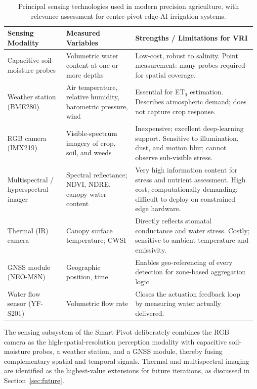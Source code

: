 \documentclass[12pt,a4paper]{report}
\renewcommand{\arraystretch}{1.3}
\begin{document}
\begin{table}[H]
\centering
\small
\caption{Principal sensing technologies used in modern precision agriculture, with relevance assessment for centre-pivot edge-AI irrigation systems.}
\label{tab:sensing}
\setlength{\tabcolsep}{4pt}
\renewcommand{\arraystretch}{1.3}
\begin{tabular}{|P{0.22\textwidth}|P{0.26\textwidth}|P{0.42\textwidth}|}
\hline
{}
\textbf{Sensing Modality} & \textbf{Measured Variables} & \textbf{Strengths / Limitations for VRI} \\
\hline
Capacitive soil-moisture probes & Volumetric water content at one or more depths & Low-cost, robust to salinity. Point measurement: many probes required for spatial coverage. \\
\hline
{}
Weather station (BME280) & Air temperature, relative humidity, barometric pressure, wind & Essential for ET$_0$ estimation. Describes atmospheric demand; does not capture crop response. \\
\hline
RGB camera (IMX219) & Visible-spectrum imagery of crop, soil, and weeds & Inexpensive; excellent deep-learning support. Sensitive to illumination, dust, and motion blur; cannot observe sub-visible stress. \\
\hline
{}
Multispectral / hyperspectral imager & Spectral reflectance; NDVI, NDRE, canopy water content & Very high information content for stress and nutrient assessment. High cost; computationally demanding; difficult to deploy on constrained edge hardware. \\
\hline
Thermal (IR) camera & Canopy surface temperature; CWSI & Directly reflects stomatal conductance and water stress. Costly; sensitive to ambient temperature and emissivity. \\
\hline
{}
GNSS module (NEO-M8N) & Geographic position, time & Enables geo-referencing of every detection for zone-based aggregation logic. \\
\hline
Water flow sensor (YF-S201) & Volumetric flow rate & Closes the actuation feedback loop by measuring water actually delivered. \\
\hline
\end{tabular}
\end{table}

The sensing subsystem of the Smart Pivot deliberately combines the RGB camera as the high-spatial-resolution perception modality with capacitive soil-moisture probes, a weather station, and a GNSS module, thereby fusing complementary spatial and temporal signals. Thermal and multispectral imaging are identified as the highest-value extensions for future iterations, as discussed in Section~\ref{sec:future}.
\end{document}
